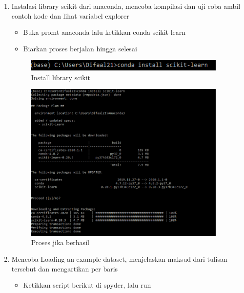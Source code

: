 	\begin{enumerate}
		\item Instalasi library scikit dari anaconda, mencoba kompilasi dan uji coba ambil contoh kode dan lihat variabel explorer

			\begin{itemize}
				\item Buka promt anaconda lalu ketikkan conda scikit-learn
				\item Biarkan proses berjalan hingga selesai
			\end{itemize}
		
			\begin{figure}[H]
				\begin{center}
				 \includegraphics[width=10cm]{figures/1174076/figures1/1.png}
				 \caption{Install library scikit}	
				\end{center}
			\end{figure}
			
			\begin{figure}[H]
				\begin{center}
				 \includegraphics[width=10cm]{figures/1174076/figures1/2.png}
				 \caption{Proses jika berhasil}	
				\end{center}
			\end{figure}
	
		\item Mencoba Loading an example dataset, menjelaskan maksud dari tulisan tersebut dan mengartikan per baris

			\begin{itemize}
				\item Ketikkan script berikut di spyder, lalu run
					
			\end{itemize}


\end{enumerate}
